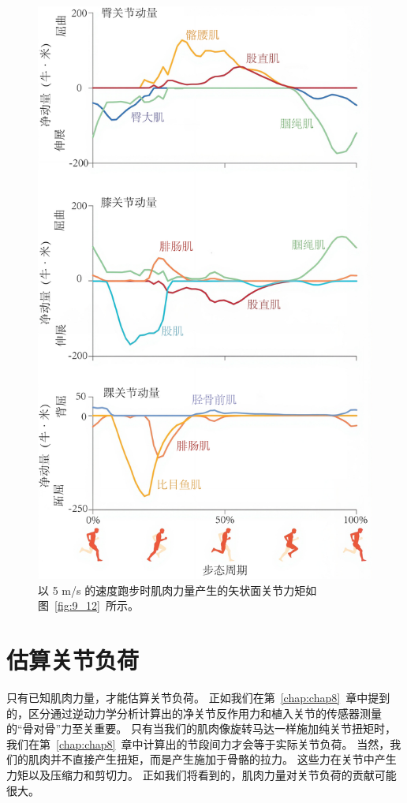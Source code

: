 \begin{figure}[!htb]
	\centering
	\includegraphics[width=0.8\linewidth]{chap9/9_13}
	\caption{以 5 m/s 的速度跑步时肌肉力量产生的矢状面关节力矩如图~\ref{fig:9_12}~所示。 \label{fig:9_13}}
\end{figure}


\section{估算关节负荷}

只有已知肌肉力量，才能估算关节负荷。
正如我们在第~\ref{chap:chap8}~章中提到的，区分通过逆动力学分析计算出的净关节反作用力和植入关节的传感器测量的“骨对骨”力至关重要。
只有当我们的肌肉像旋转马达一样施加纯关节扭矩时，我们在第~\ref{chap:chap8}~章中计算出的节段间力才会等于实际关节负荷。
当然，我们的肌肉并不直接产生扭矩，而是产生施加于骨骼的拉力。
这些力在关节中产生力矩以及压缩力和剪切力。
正如我们将看到的，肌肉力量对关节负荷的贡献可能很大。


